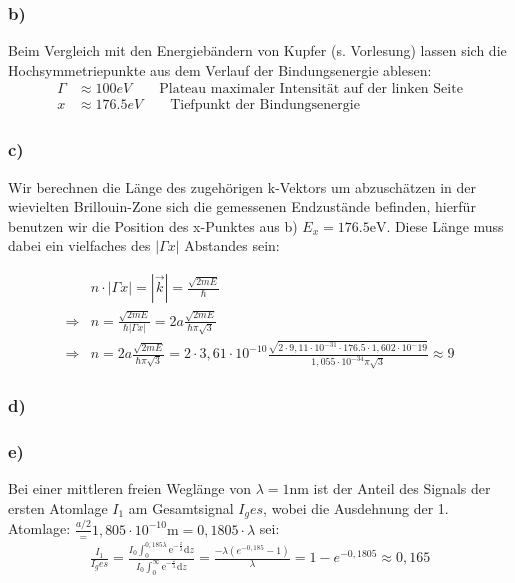 \subsubsection*{b)}
Beim Vergleich mit den Energiebändern von Kupfer (s. Vorlesung) lassen sich die Hochsymmetriepunkte aus dem Verlauf der Bindungsenergie ablesen:
\begin{align*}
\Gamma &\approx 100 \unit{eV}\qquad\text{Plateau maximaler  Intensität auf der linken Seite}\\
x &\approx 176.5\unit{eV} \qquad\text{Tiefpunkt der Bindungsenergie}
\end{align*}
\subsubsection*{c)}
Wir berechnen die Länge des zugehörigen k-Vektors um abzuschätzen in der wievielten 
Brillouin-Zone sich die gemessenen Endzustände befinden, hierfür benutzen wir die 
Position des x-Punktes aus b) $E_x = 176.5 \mathrm{eV}$. Diese Länge muss dabei ein
vielfaches des $|\Gamma x|$ Abstandes sein:

 
\begin{align*}
&n\cdot |\Gamma x| = |\vec{k}| = \frac{\sqrt{2mE}}{\hbar}\\
\Rightarrow & n = \frac{\sqrt{2mE}}{\hbar|\Gamma x|} = 2a\frac{\sqrt{2mE}}{\hbar\pi\sqrt{3}}\\
\Rightarrow & n =  2a\frac{\sqrt{2mE}}{\hbar\pi\sqrt{3}} = 2\cdot3,61\cdot10^{-10}\frac{\sqrt{2\cdot9,11\cdot10^{-31}\cdot176.5\cdot1,602\cdot10^-19}}{1,055\cdot10^{-34}\pi\sqrt{3}} \approx 9
\end{align*}
\subsubsection*{d)}

\subsubsection*{e)}
Bei einer mittleren freien Weglänge von $\lambda = 1\mathrm{nm}$ ist der Anteil des Signals der ersten Atomlage $I_1$ am Gesamtsignal $I_ges$, wobei die Ausdehnung der 1. Atomlage: $\frac{a/2} = 1,805\cdot10^{-10} \mathrm{m} = 0,1805\cdot \lambda$ sei:
\begin{align*}
\frac{I_1}{I_ges} = \frac{I_0\int_0^{0,185\lambda}\mathrm{e}^{-\frac{z}{\lambda}}\mathrm{d}z}{I_0\int_0^{\infty}\mathrm{e}^{-\frac{z}{\lambda}}\mathrm{d}z} = \frac{-\lambda(e^{-0,185}-1)}{\lambda} = 1-e^{-0,1805} \approx 0,165
\end{align*}